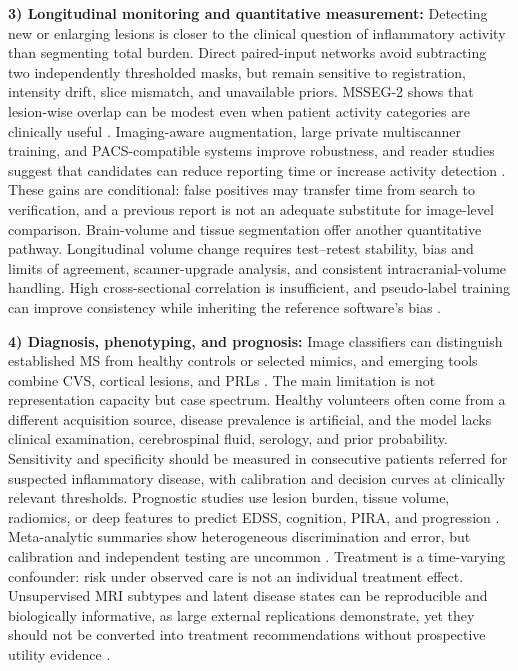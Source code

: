 \documentclass[journal,twoside,web]{ieeecolor}
\begin{document}
\textbf{3) Longitudinal monitoring and quantitative measurement:} Detecting new or enlarging lesions is closer to the clinical question of inflammatory activity than segmenting total burden. Direct paired-input networks avoid subtracting two independently thresholded masks, but remain sensitive to registration, intensity drift, slice mismatch, and unavailable priors. MSSEG-2 shows that lesion-wise overlap can be modest even when patient activity categories are clinically useful \cite{msseg2}. Imaging-aware augmentation, large private multiscanner training, and PACS-compatible systems improve robustness, and reader studies suggest that candidates can reduce reporting time or increase activity detection \cite{msseg_aug,kruger,barnett,combes,peters2024,sieber}. These gains are conditional: false positives may transfer time from search to verification, and a previous report is not an adequate substitute for image-level comparison. Brain-volume and tissue segmentation offer another quantitative pathway. Longitudinal volume change requires test--retest stability, bias and limits of agreement, scanner-upgrade analysis, and consistent intracranial-volume handling. High cross-sectional correlation is insufficient, and pseudo-label training can improve consistency while inheriting the reference software's bias \cite{deepbvc,mindglide}.


\textbf{4) Diagnosis, phenotyping, and prognosis:} Image classifiers can distinguish established MS from healthy controls or selected mimics, and emerging tools combine CVS, cortical lesions, and PRLs \cite{eitel,rocca,seok,combined_classifier}. The main limitation is not representation capacity but case spectrum. Healthy volunteers often come from a different acquisition source, disease prevalence is artificial, and the model lacks clinical examination, cerebrospinal fluid, serology, and prior probability. Sensitivity and specificity should be measured in consecutive patients referred for suspected inflammatory disease, with calibration and decision curves at clinically relevant thresholds. Prognostic studies use lesion burden, tissue volume, radiomics, or deep features to predict EDSS, cognition, PIRA, and progression \cite{tousignant,storelli,pontillo,denissen,poretto,cagol}. Meta-analytic summaries show heterogeneous discrimination and error, but calibration and independent testing are uncommon \cite{houshi}. Treatment is a time-varying confounder: risk under observed care is not an individual treatment effect. Unsupervised MRI subtypes and latent disease states can be reproducible and biologically informative, as large external replications demonstrate, yet they should not be converted into treatment recommendations without prospective utility evidence \cite{eshaghi,progression_reclass}.
\end{document}
